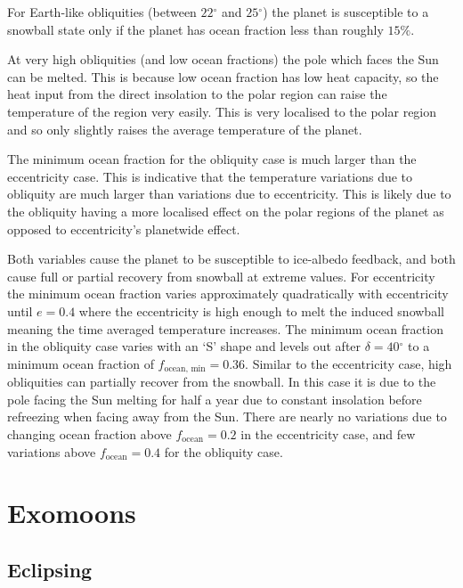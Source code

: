 \documentclass[12pt, onecolumn]{revtex4-2}    %
\newcommand{\degrees}{\ensuremath{^{\circ}}}
\begin{document}
For Earth-like obliquities (between $22\degrees$ and $25\degrees$) the planet is susceptible to a snowball state only if the planet has ocean fraction less than roughly $15\%$.

At very high obliquities (and low ocean fractions) the pole which faces the Sun can be melted.
This is because low ocean fraction has low heat capacity, so the heat input from the direct insolation to the polar region can raise the temperature of the region very easily.
This is very localised to the polar region and so only slightly raises the average temperature of the planet.

The minimum ocean fraction for the obliquity case is much larger than the eccentricity case.
This is indicative that the temperature variations due to obliquity are much larger than variations due to eccentricity.
This is likely due to the obliquity having a more localised effect on the polar regions of the planet as opposed to eccentricity's planetwide effect.

Both variables cause the planet to be susceptible to ice-albedo feedback, and both cause full or partial recovery from snowball at extreme values.
For eccentricity the minimum ocean fraction varies approximately quadratically with eccentricity until $e = 0.4$ where the eccentricity is high enough to melt the induced snowball meaning the time averaged temperature increases.
The minimum ocean fraction in the obliquity case varies with an `S' shape and levels out after $\delta = 40\degrees$ to a minimum ocean fraction of $f_\text{ocean, min} = 0.36$.
Similar to the eccentricity case, high obliquities can partially recover from the snowball. In this case it is due to the pole facing the Sun melting for half a year due to constant insolation before refreezing when facing away from the Sun.
There are nearly no variations due to changing ocean fraction above $f_\text{ocean} = 0.2$ in the eccentricity case, and few variations above $f_\text{ocean} = 0.4$ for the obliquity case.

\section{Exomoons} \label{sec:Exomoons}
\subsection{Eclipsing} \label{ssec:InvEclipsing}
\end{document}
